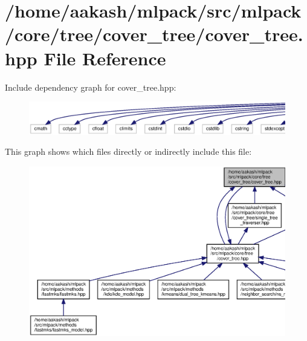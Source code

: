 \section{/home/aakash/mlpack/src/mlpack/core/tree/cover\+\_\+tree/cover\+\_\+tree.hpp File Reference}
\label{cover__tree_2cover__tree_8hpp}
Include dependency graph for cover\+\_\+tree.\+hpp\+:
\nopagebreak
\begin{figure}[H]
\begin{center}
\leavevmode
\includegraphics[width=350pt]{cover__tree_2cover__tree_8hpp__incl}
\end{center}
\end{figure}
This graph shows which files directly or indirectly include this file\+:
\nopagebreak
\begin{figure}[H]
\begin{center}
\leavevmode
\includegraphics[width=350pt]{cover__tree_2cover__tree_8hpp__dep__incl}
\end{center}
\end{figure}

